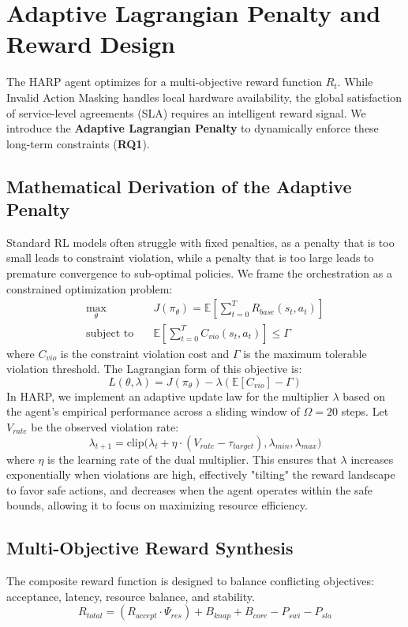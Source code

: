 \documentclass[12pt, a4paper, reqno, oneside]{book}
\begin{document}
\section{Adaptive Lagrangian Penalty and Reward Design}
The HARP agent optimizes for a multi-objective reward function $R_t$. While Invalid Action Masking handles local hardware availability, the global satisfaction of service-level agreements (SLA) requires an intelligent reward signal. We introduce the \textbf{Adaptive Lagrangian Penalty} to dynamically enforce these long-term constraints (\textbf{RQ1}).

\subsection{Mathematical Derivation of the Adaptive Penalty}
Standard RL models often struggle with fixed penalties, as a penalty that is too small leads to constraint violation, while a penalty that is too large leads to premature convergence to sub-optimal policies. We frame the orchestration as a constrained optimization problem:
\begin{align}
\max_{\theta} \quad & J(\pi_\theta) = \mathbb{E} [ \sum_{t=0}^T R_{base}(s_t, a_t) ] \\
\text{subject to} \quad & \mathbb{E} [ \sum_{t=0}^T C_{vio}(s_t, a_t) ] \le \Gamma
\end{align}
where $C_{vio}$ is the constraint violation cost and $\Gamma$ is the maximum tolerable violation threshold. The Lagrangian form of this objective is:
\begin{equation}
L(\theta, \lambda) = J(\pi_\theta) - \lambda \left( \mathbb{E} [ C_{vio} ] - \Gamma \right)
\end{equation}
In HARP, we implement an adaptive update law for the multiplier $\lambda$ based on the agent's empirical performance across a sliding window of $\Omega=20$ steps. Let $V_{rate}$ be the observed violation rate:
\begin{equation}
\lambda_{t+1} = \text{clip}\Big(\lambda_{t} + \eta \cdot (V_{rate} - \tau_{target}), \lambda_{min}, \lambda_{max} \Big)
\end{equation}
where $\eta$ is the learning rate of the dual multiplier. This ensures that $\lambda$ increases exponentially when violations are high, effectively "tilting" the reward landscape to favor safe actions, and decreases when the agent operates within the safe bounds, allowing it to focus on maximizing resource efficiency.

\subsection{Multi-Objective Reward Synthesis}
The composite reward function is designed to balance conflicting objectives: acceptance, latency, resource balance, and stability.
\begin{equation}
R_{total} = (R_{accept} \cdot \Psi_{res}) + B_{knap} + B_{core} - P_{swi} - P_{sla}
\end{equation}
\end{document}

